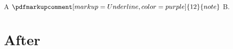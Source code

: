 \documentclass{article}
\begin{document}
A \ensuremath{\pdfmarkupcomment[markup=Underline,color=purple]{\mbox{12}}{note}} B.
\gdef\AfterMarkup{}
\section{After}\label{after}
\gdef\SatexReachedEnd{}
\end{document}
